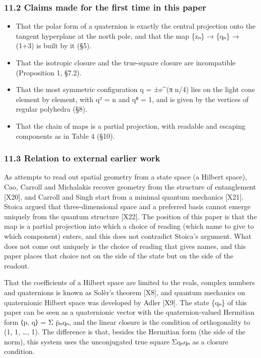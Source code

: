 \documentclass[
  a4paper,
]{article}
\providecommand{\tightlist}{%
  \setlength{\itemsep}{0pt}\setlength{\parskip}{0pt}}
\begin{document}
\subsubsection{11.2 Claims made for the first time in this
paper}\label{claims-made-for-the-first-time-in-this-paper}

\begin{itemize}
\tightlist
\item
  That the polar form of a quaternion is exactly the central projection
  onto the tangent hyperplane at the north pole, and that the map \{zₙ\}
  → \{qₙ\} → (1+3) is built by it (§5).
\item
  That the isotropic closure and the true-square closure are
  incompatible (Proposition 1, §7.2).
\item
  That the most symmetric configuration q = ±e\^{}(π n/4) lies on the
  light cone element by element, with q² = n and q⁸ = 1, and is given by
  the vertices of regular polyhedra (§8).
\item
  That the chain of maps is a partial projection, with readable and
  escaping components as in Table 4 (§10).
\end{itemize}

\subsubsection{11.3 Relation to external earlier
work}\label{relation-to-external-earlier-work}

As attempts to read out spatial geometry from a state space (a Hilbert
space), Cao, Carroll and Michalakis recover geometry from the structure
of entanglement {[}X20{]}, and Carroll and Singh start from a minimal
quantum mechanics {[}X21{]}. Stoica argued that three-dimensional space
and a preferred basis cannot emerge uniquely from the quantum structure
{[}X22{]}. The position of this paper is that the map is a partial
projection into which a choice of reading (which name to give to which
component) enters, and this does not contradict Stoica's argument. What
does not come out uniquely is the choice of reading that gives names,
and this paper places that choice not on the side of the state but on
the side of the readout.

That the coefficients of a Hilbert space are limited to the reals,
complex numbers and quaternions is known as Solèr's theorem {[}X8{]},
and quantum mechanics on quaternionic Hilbert space was developed by
Adler {[}X9{]}. The state \{qₙ\} of this paper can be seen as a
quaternionic vector with the quaternion-valued Hermitian form ⟨p, q⟩ = Σ
p̄ₙqₙ, and the linear closure is the condition of orthogonality to (1, 1,
\ldots, 1). The difference is that, besides the Hermitian form (the side
of the norm), this system uses the unconjugated true square Σqₙqₙ as a
closure condition.
\end{document}
